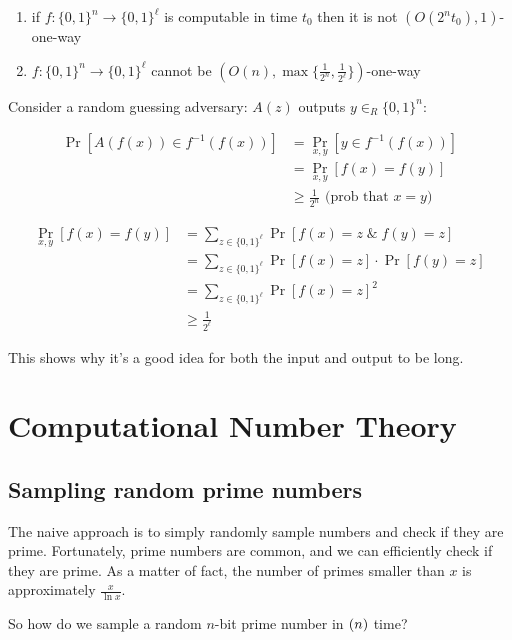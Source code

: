 \documentclass{idc_msc}
\let\polynomial\relax
\DeclareMathOperator*{\polynomial}{\mathrm{poly}}
\begin{document}
\begin{enumerate}
  \item if \(f:\{0, 1\}^n \to \{0, 1\}^\ell\) is computable in time \(t_0\) then it is not \((O(2^n t_0), 1)\)-one-way
  \item \(f : \{0, 1\}^n \to \{0, 1\}^\ell\) cannot be \((O(n), \max \{\frac{1}{2^n}, \frac{1}{2^\ell}\})\)-one-way
\end{enumerate}

Consider a random guessing adversary: \(A(z)\) outputs \(y \in_R \{0, 1\}^n\):

\[
\begin{aligned}
  \Pr[A(f(x)) \in f^{-1}(f(x))] &= \Pr_{x,y}[y \in f^{-1}(f(x))] \\
  &= \Pr_{x,y}[f(x) = f(y)] \\
  & \ge \frac{1}{2^n}\text{ (prob that \(x = y\))}
\end{aligned}
\]

\[
\begin{aligned}
\Pr_{x,y}[f(x) = f(y)] &= \sum_{z \in \{0, 1\}^\ell} \Pr[f(x) = z \;\&\; f(y) = z] \\
&= \sum_{z \in \{0, 1\}^\ell} \Pr[f(x) = z] \cdot \Pr[f(y) = z] \\
&= \sum_{z \in \{0, 1\}^\ell} \Pr[f(x) = z]^2 \\
& \ge \frac{1}{2^\ell}
\end{aligned}
\]

This shows why it's a good idea for both the input and output to be long.

\section{Computational Number Theory}

\subsection{Sampling random prime numbers}

The naive approach is to simply randomly sample numbers and check if they are prime.
Fortunately, prime numbers are common, and we can efficiently check if they are prime.
As a matter of fact, the number of primes smaller than \(x\) is approximately \(\frac{x}{\ln x}\).

So how do we sample a random \(n\)-bit prime number in \(\polynomial(n)\) time?
\end{document}
